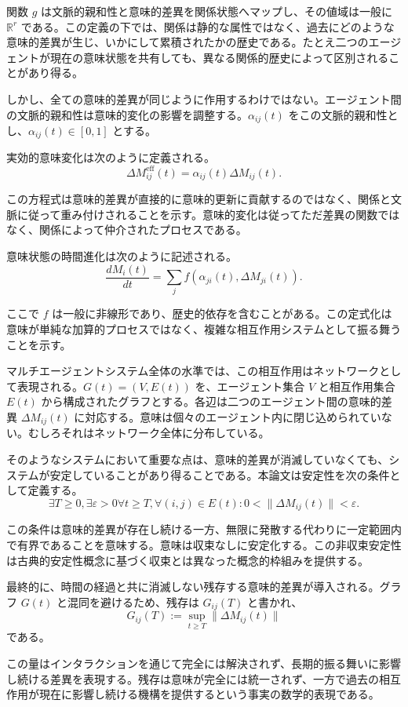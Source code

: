 \documentclass[11pt,a4paper]{article}
\theoremstyle{definition}
\begin{document}
関数 $g$ は文脈的親和性と意味的差異を関係状態へマップし、その値域は一般に $\mathbb{R}^r$ である。この定義の下では、関係は静的な属性ではなく、過去にどのような意味的差異が生じ、いかにして累積されたかの歴史である。たとえ二つのエージェントが現在の意味状態を共有しても、異なる関係的歴史によって区別されることがあり得る。

しかし、全ての意味的差異が同じように作用するわけではない。エージェント間の文脈的親和性は意味的変化の影響を調整する。$\alpha_{ij}(t)$ をこの文脈的親和性とし、$\alpha_{ij}(t) \in [0, 1]$ とする。

実効的意味変化は次のように定義される。
\[
\Delta M^{\text{eff}}_{ij}(t) = \alpha_{ij}(t) \Delta M_{ij}(t).
\]

この方程式は意味的差異が直接的に意味的更新に貢献するのではなく、関係と文脈に従って重み付けされることを示す。意味的変化は従ってただ差異の関数ではなく、関係によって仲介されたプロセスである。

意味状態の時間進化は次のように記述される。
\[
\frac{dM_i(t)}{dt} = \sum_j f(\alpha_{ji}(t), \Delta M_{ji}(t)).
\]

ここで $f$ は一般に非線形であり、歴史的依存を含むことがある。この定式化は意味が単純な加算的プロセスではなく、複雑な相互作用システムとして振る舞うことを示す。

マルチエージェントシステム全体の水準では、この相互作用はネットワークとして表現される。$G(t) = (V, E(t))$ を、エージェント集合 $V$ と相互作用集合 $E(t)$ から構成されたグラフとする。各辺は二つのエージェント間の意味的差異 $\Delta M_{ij}(t)$ に対応する。意味は個々のエージェント内に閉じ込められていない。むしろそれはネットワーク全体に分布している。

そのようなシステムにおいて重要な点は、意味的差異が消滅していなくても、システムが安定していることがあり得ることである。本論文は安定性を次の条件として定義する。
\[
\exists T \geq 0, \exists \varepsilon > 0 \forall t \geq T, \forall (i,j) \in E(t) : 0 < \|\Delta M_{ij}(t)\| < \varepsilon.
\]

この条件は意味的差異が存在し続ける一方、無限に発散する代わりに一定範囲内で有界であることを意味する。意味は収束なしに安定化する。この非収束安定性は古典的安定性概念に基づく収束とは異なった概念的枠組みを提供する。

最終的に、時間の経過と共に消滅しない残存する意味的差異が導入される。グラフ $G(t)$ と混同を避けるため、残存は $G_{ij}(T)$ と書かれ、
\[
G_{ij}(T) := \sup_{t \geq T} \|\Delta M_{ij}(t)\|
\]
である。

この量はインタラクションを通じて完全には解決されず、長期的振る舞いに影響し続ける差異を表現する。残存は意味が完全には統一されず、一方で過去の相互作用が現在に影響し続ける機構を提供するという事実の数学的表現である。
\end{document}
